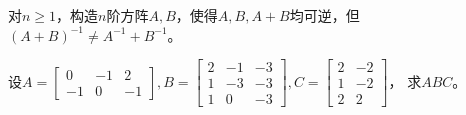 \begin{ex} \label{ex:3.10}
对$n\geqslant 1$，构造$n$阶方阵$A, B$，使得$A, B, A+B$均可逆，但$(A+B)^{-1}\neq A^{-1}+B^{-1}$。
\end{ex}

\begin{ex} \label{ex:3.11}
设$A = \begin{bmatrix} 0 & -1 & 2 \\ -1 & 0 & -1 \end{bmatrix}, B = \begin{bmatrix} 2 & -1 & -3 \\ 1 & -3 & -3 \\ 1 & 0 & -3 \end{bmatrix}, C = \begin{bmatrix} 2 & -2 \\ 1 & -2 \\ 2 & 2 \end{bmatrix}$， 求$ABC$。
\end{ex}


